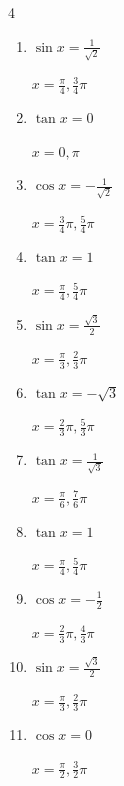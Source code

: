 \begin{multicols}{4}
\begin{enumerate}
        $\displaystyle x = \frac{\pi}{3} , \frac{5}{3}\pi$

  \item $\displaystyle \sin{x}  = \frac{1}{\sqrt{2}}$

        $\displaystyle x = \frac{\pi}{4} , \frac{3}{4}\pi$

  \item $\displaystyle \tan{x}  = 0$

        $\displaystyle x = 0 , \pi$

  \item $\displaystyle \cos{x}  = -\frac{1}{\sqrt{2}}$

        $\displaystyle x = \frac{3}{4}\pi , \frac{5}{4}\pi$

  \item $\displaystyle \tan{x}  = 1$

        $\displaystyle x = \frac{\pi}{4} , \frac{5}{4}\pi$

  \item $\displaystyle \sin{x}  = \frac{\sqrt{3}}{2}$

        $\displaystyle x = \frac{\pi}{3} , \frac{2}{3}\pi$

  \item $\displaystyle \tan{x}  = -\sqrt{3}$

        $\displaystyle x = \frac{2}{3}\pi , \frac{5}{3}\pi$

  \item $\displaystyle \tan{x}  = \frac{1}{\sqrt{3}}$

        $\displaystyle x = \frac{\pi}{6} , \frac{7}{6}\pi$

  \item $\displaystyle \tan{x}  = 1$

        $\displaystyle x = \frac{\pi}{4} , \frac{5}{4}\pi$

  \item $\displaystyle \cos{x}  = -\frac{1}{2}$

        $\displaystyle x = \frac{2}{3}\pi , \frac{4}{3}\pi$

\columnbreak %

  \item $\displaystyle \sin{x}  = \frac{\sqrt{3}}{2}$

        $\displaystyle x = \frac{\pi}{3} , \frac{2}{3}\pi$

  \item $\displaystyle \cos{x}  = 0$

        $\displaystyle x = \frac{\pi}{2} , \frac{3}{2}\pi$


\end{enumerate}
\end{multicols}
